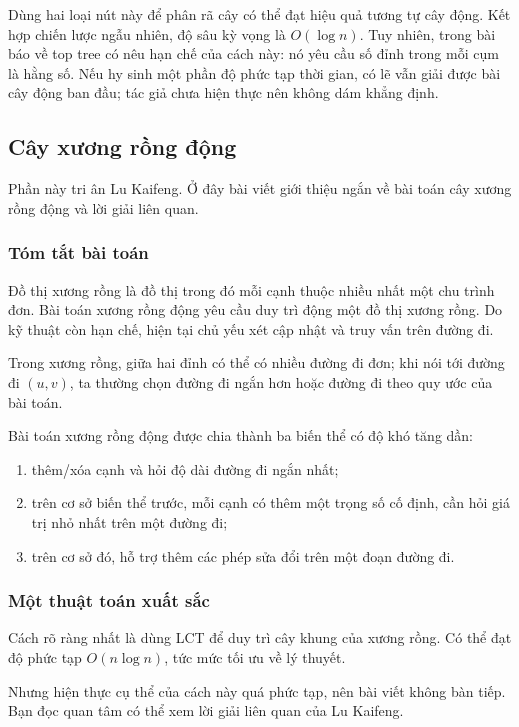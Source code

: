 \documentclass[11pt]{article}
\begin{document}
Dùng hai loại nút này để phân rã cây có thể đạt hiệu quả tương tự cây động. Kết
hợp chiến lược ngẫu nhiên, độ sâu kỳ vọng là \(O(\log n)\). Tuy nhiên, trong bài
báo về top tree có nêu hạn chế của cách này: nó yêu cầu số đỉnh trong mỗi cụm là
hằng số. Nếu hy sinh một phần độ phức tạp thời gian, có lẽ vẫn giải được bài cây
động ban đầu; tác giả chưa hiện thực nên không dám khẳng định.

\subsection{Cây xương rồng động}

Phần này tri ân Lu Kaifeng. Ở đây bài viết giới thiệu ngắn về bài toán cây xương
rồng động và lời giải liên quan.

\subsubsection{Tóm tắt bài toán}

Đồ thị xương rồng là đồ thị trong đó mỗi cạnh thuộc nhiều nhất một chu trình đơn.
Bài toán xương rồng động yêu cầu duy trì động một đồ thị xương rồng. Do kỹ thuật
còn hạn chế, hiện tại chủ yếu xét cập nhật và truy vấn trên đường đi.

Trong xương rồng, giữa hai đỉnh có thể có nhiều đường đi đơn; khi nói tới đường
đi \((u,v)\), ta thường chọn đường đi ngắn hơn hoặc đường đi theo quy ước của
bài toán.

Bài toán xương rồng động được chia thành ba biến thể có độ khó tăng dần:
\begin{enumerate}
  \item thêm/xóa cạnh và hỏi độ dài đường đi ngắn nhất;
  \item trên cơ sở biến thể trước, mỗi cạnh có thêm một trọng số cố định, cần
  hỏi giá trị nhỏ nhất trên một đường đi;
  \item trên cơ sở đó, hỗ trợ thêm các phép sửa đổi trên một đoạn đường đi.
\end{enumerate}

\subsubsection{Một thuật toán xuất sắc}

Cách rõ ràng nhất là dùng LCT để duy trì cây khung của xương rồng. Có thể đạt
độ phức tạp \(O(n\log n)\), tức mức tối ưu về lý thuyết.

Nhưng hiện thực cụ thể của cách này quá phức tạp, nên bài viết không bàn tiếp.
Bạn đọc quan tâm có thể xem lời giải liên quan của Lu Kaifeng.
\end{document}

